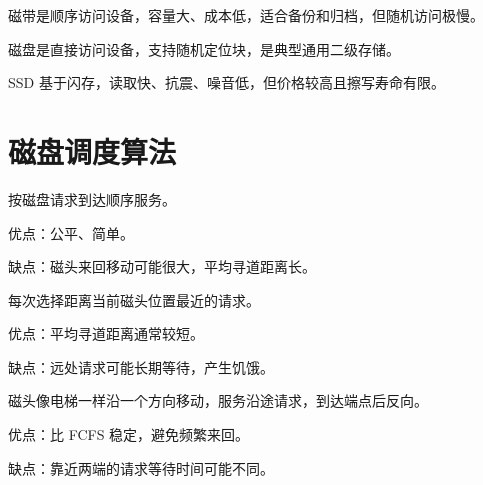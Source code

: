 \begin{points}
  \item 磁带是顺序访问设备，容量大、成本低，适合备份和归档，但随机访问极慢。
  \item 磁盘是直接访问设备，支持随机定位块，是典型通用二级存储。
  \item SSD 基于闪存，读取快、抗震、噪音低，但价格较高且擦写寿命有限。
\end{points}


\section{磁盘调度算法}
\begin{points}
  \item 按磁盘请求到达顺序服务。
  \item 优点：公平、简单。
  \item 缺点：磁头来回移动可能很大，平均寻道距离长。
\end{points}


\begin{points}
  \item 每次选择距离当前磁头位置最近的请求。
  \item 优点：平均寻道距离通常较短。
  \item 缺点：远处请求可能长期等待，产生饥饿。
\end{points}


\begin{points}
  \item 磁头像电梯一样沿一个方向移动，服务沿途请求，到达端点后反向。
  \item 优点：比 FCFS 稳定，避免频繁来回。
  \item 缺点：靠近两端的请求等待时间可能不同。
\end{points}


